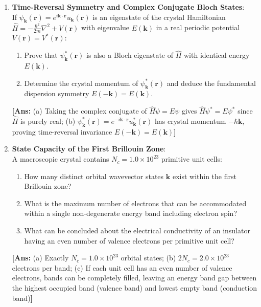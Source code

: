 \documentclass[11pt,a4paper]{article}
\newcommand{\vb}[1]{\mathbf{#1}}
\begin{document}
\begin{enumerate}[label=\textbf{\arabic*.}, resume, leftmargin=*]
    \item \textbf{Time-Reversal Symmetry and Complex Conjugate Bloch States}:\\
    If $\psi_{\vb{k}}(\vb{r}) = e^{i\vb{k}\cdot\vb{r}} u_{\vb{k}}(\vb{r})$ is an eigenstate of the crystal Hamiltonian $\hat{H} = -\frac{\hbar^2}{2m}\nabla^2 + V(\vb{r})$ with eigenvalue $E(\vb{k})$ in a real periodic potential $V(\vb{r}) = V^*(\vb{r})$:
    \begin{enumerate}[label=(\alph*)]
        \item Prove that $\psi_{\vb{k}}^*(\vb{r})$ is also a Bloch eigenstate of $\hat{H}$ with identical energy $E(\vb{k})$.
        \item Determine the crystal momentum of $\psi_{\vb{k}}^*(\vb{r})$ and deduce the fundamental dispersion symmetry $E(-\vb{k}) = E(\vb{k})$.
    \end{enumerate}
    \textbf{[Ans:} (a) Taking the complex conjugate of $\hat{H}\psi = E\psi$ gives $\hat{H}\psi^* = E\psi^*$ since $\hat{H}$ is purely real; (b) $\psi_{\vb{k}}^*(\vb{r}) = e^{-i\vb{k}\cdot\vb{r}} u_{\vb{k}}^*(\vb{r})$ has crystal momentum $-\hbar\vb{k}$, proving time-reversal invariance $E(-\vb{k}) = E(\vb{k})$\textbf{]}

    \item \textbf{State Capacity of the First Brillouin Zone}:\\
    A macroscopic crystal contains $N_c = 1.0 \times 10^{23}$ primitive unit cells:
    \begin{enumerate}[label=(\alph*)]
        \item How many distinct orbital wavevector states $\vb{k}$ exist within the first Brillouin zone?
        \item What is the maximum number of electrons that can be accommodated within a single non-degenerate energy band including electron spin?
        \item What can be concluded about the electrical conductivity of an insulator having an even number of valence electrons per primitive unit cell?
    \end{enumerate}
    \textbf{[Ans:} (a) Exactly $N_c = 1.0 \times 10^{23}$ orbital states; (b) $2N_c = 2.0 \times 10^{23}$ electrons per band; (c) If each unit cell has an even number of valence electrons, bands can be completely filled, leaving an energy band gap between the highest occupied band (valence band) and lowest empty band (conduction band)\textbf{]}


\end{enumerate}
\end{document}
